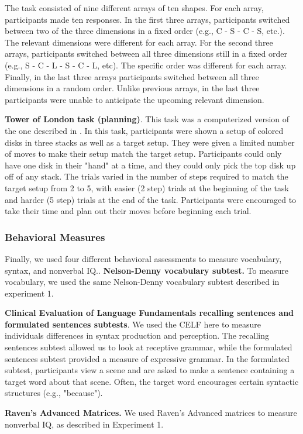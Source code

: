 \documentclass[../dissertation.tex]{subfiles}
\begin{document}
The task consisted of nine different arrays of ten shapes. For each array, participants made ten responses. In the first three arrays, participants switched between two of the three dimensions in a fixed order (e.g., C - S - C - S, etc.). The relevant dimensions were different for each array. For the second three arrays, participants switched between all three dimensions still in a fixed order (e.g., S - C - L - S - C - L, etc). The specific order was different for each array. Finally, in the last three arrays participants switched between all three dimensions in a random order. Unlike previous arrays, in the last three participants were unable to anticipate the upcoming relevant dimension. \par
\textbf{Tower of London task (planning)}. This task was a computerized version of the one described in \citet{Shallice1982}. In this task, participants were shown a setup of colored disks in three stacks as well as a target setup. They were given a limited number of moves to make their setup match the target setup. Participants could only have one disk in their "hand" at a time, and they could only pick the top disk up off of any stack. The trials varied in the number of steps required to match the target setup from 2 to 5, with easier (2 step) trials at the beginning of the task and harder (5 step) trials at the end of the task. Participants were encouraged to take their time and plan out their moves before beginning each trial.

\subsubsection{Behavioral Measures} 
Finally, we used four different behavioral assessments to measure vocabulary, syntax, and nonverbal IQ..
\textbf{Nelson-Denny vocabulary subtest.} To measure vocabulary, we used the same Nelson-Denny vocabulary subtest described in experiment 1. \par
\textbf{Clinical Evaluation of Language Fundamentals recalling sentences and formulated sentences subtests}. We used the CELF here to measure individuals differences in syntax production and perception. The recalling sentences subtest allowed us to look at receptive grammar, while the formulated sentences subtest provided a measure of expressive grammar. In the formulated subtest, participants view a scene and are asked to make a sentence containing a target word about that scene. Often, the target word encourages certain syntactic structures (e.g., "because"). \par
\textbf{Raven's Advanced Matrices.} We used Raven's Advanced matrices to measure nonverbal IQ, as described in Experiment 1.
\end{document}
